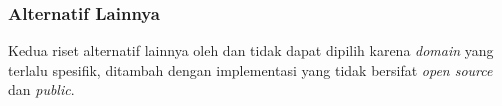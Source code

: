 



\subsubsection{Alternatif Lainnya}

Kedua riset alternatif lainnya oleh \cite{baqa2019semantic} dan \cite{cano2021toward} tidak dapat dipilih karena \textit{domain} yang terlalu spesifik, ditambah dengan implementasi yang tidak bersifat \textit{open source} dan \textit{public}.



